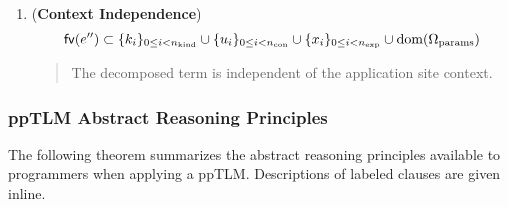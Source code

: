 \begin{theorem}
\begin{enumerate}
\begin{quote}
		\end{quote}
	\item (\textbf{Context Independence}) \[\mathsf{fv}(e'') \subset \{k_i\}_{0 \leq i < n_\text{kind}} \cup \{u_i\}_{0 \leq i < n_\text{con}} \cup \{x_i\}_{0 \leq i < n_\text{exp}} \cup \text{dom}(\Omega_\text{params})\]
		\begin{quote}
			The decomposed term is independent of the application site context.
		\end{quote}
\end{enumerate}
\end{theorem}
\endgroup

\subsubsection{ppTLM Abstract Reasoning Principles}
The following theorem summarizes the abstract reasoning principles available to programmers when applying a ppTLM. Descriptions of labeled clauses are given inline.

